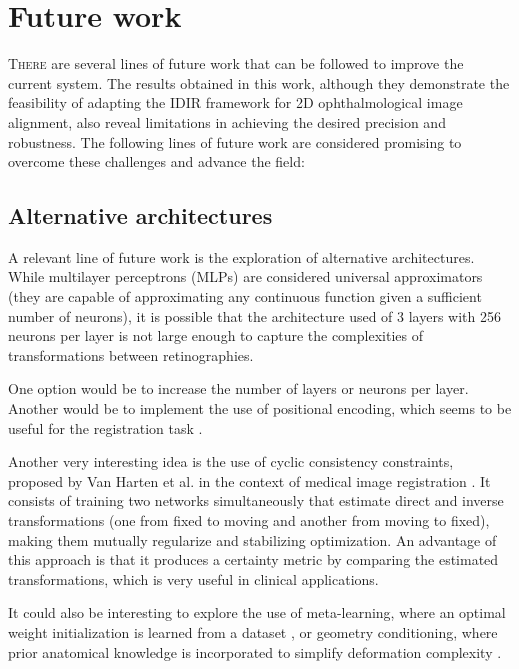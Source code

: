 \chapter{Future work}
\label{chap:Traballo futuro}

\lettrine{T}{here} are several lines of future work that can be followed to improve the current system.
The results obtained in this work, although they demonstrate the feasibility of adapting the IDIR framework for 2D ophthalmological image alignment, also reveal limitations in achieving the desired precision and robustness.
The following lines of future work are considered promising to overcome these challenges and advance the field:

\section{Alternative architectures}
\label{sec:Arquitecturas alternativas}

A relevant line of future work is the exploration of alternative architectures.
While multilayer perceptrons (MLPs) are considered universal approximators \cite{HORNIK1989359} (they are capable of approximating any continuous function given a sufficient number of neurons), it is possible that the architecture used of 3 layers with 256 neurons per layer is not large enough to capture the complexities of transformations between retinographies.

One option would be to increase the number of layers or neurons per layer. Another would be to implement the use of positional encoding, which seems to be useful for the registration task \cite{mueller2022instant}.

Another very interesting idea is the use of cyclic consistency constraints, proposed by Van Harten et al. in the context of medical image registration \cite{van_Harten_2024}. It consists of training two networks simultaneously that estimate direct and inverse transformations (one from fixed to moving and another from moving to fixed), making them mutually regularize and stabilizing optimization.
An advantage of this approach is that it produces a certainty metric by comparing the estimated transformations, which is very useful in clinical applications.

It could also be interesting to explore the use of meta-learning, where an optimal weight initialization is learned from a dataset \cite{learnedinit}, or geometry conditioning, where prior anatomical knowledge is incorporated to simplify deformation complexity \cite{harten2023deformable}.

